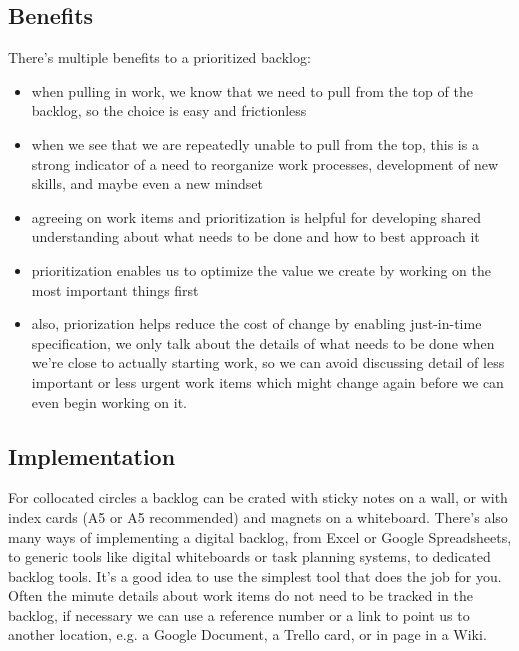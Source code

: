 \subsection{Benefits}
\label{benefits}

There's multiple benefits to a prioritized backlog:

\begin{itemize}
\item when pulling in work, we know that we need to pull from the top of the backlog, so the choice is easy and frictionless

\item when we see that we are repeatedly unable to pull from the top, this is a strong indicator of a need to reorganize work processes, development of new skills, and maybe even a new mindset

\item agreeing on work items and prioritization is helpful for developing shared understanding about what needs to be done and how to best approach it

\item prioritization enables us to optimize the value we create by working on the most important things first

\item also, priorization helps reduce the cost of change by enabling just-in-time specification, we only talk about the details of what needs to be done when we're close to actually starting work, so we can avoid discussing detail of less important or less urgent work items which might change again before we can even begin working on it.

\end{itemize}

\subsection{Implementation}
\label{implementation}

For collocated circles a backlog can be crated with sticky notes on a wall, or with index cards (A5 or A5 recommended) and magnets on a whiteboard. There's also many ways of implementing a digital backlog, from Excel or Google Spreadsheets, to generic tools like digital whiteboards or task planning systems, to dedicated backlog tools. It's a good idea to use the simplest tool that does the job for you. Often the minute details about work items do not need to be tracked in the backlog, if necessary we can use a reference number or a link to point us to another location, e.g. a Google Document, a Trello card, or in page in a Wiki.

